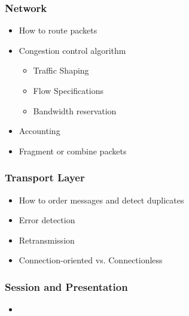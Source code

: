 \subsubsection{Network}\label{subsubsec:Network_Protocols}
\begin{itemize}
\item How to route packets
\item Congestion control algorithm
\begin{itemize}
\item Traffic Shaping
\item Flow Specifications
\item Bandwidth reservation
\end{itemize}
\item Accounting
\item Fragment or combine packets
\end{itemize}

\subsubsection{Transport Layer}\label{subsubsec:Transport_Layer_Protocols}
\begin{itemize}
\item How to order messages and detect duplicates
\item Error detection
\item Retransmission
\item Connection-oriented vs. Connectionless
\end{itemize}

\subsubsection{Session and Presentation}\label{subsubsec:Session_Presentation_Protocols}
\begin{itemize}
\item
\end{itemize}


